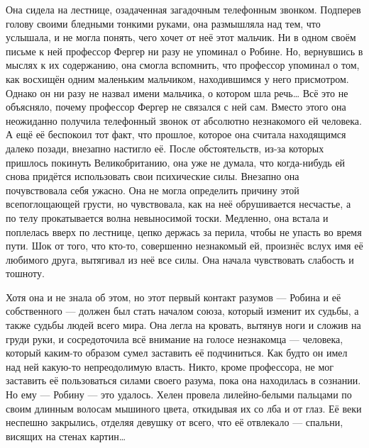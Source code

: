 \documentclass[a4paper,12pt]{book}
\begin{document}
	Она сидела на лестнице, озадаченная загадочным телефонным звонком. Подперев голову своими бледными тонкими руками, она размышляла над тем, что услышала, и не могла понять, чего хочет от неё этот мальчик. Ни в одном своём письме к ней профессор Фергер ни разу не упоминал о Робине. Но, вернувшись в мыслях к их содержанию, она смогла вспомнить, что профессор упоминал о том, как восхищён одним маленьким мальчиком, находившимся у него присмотром. Однако он ни разу не назвал имени мальчика, о котором шла речь…
	Всё это не объясняло, почему профессор Фергер не связался с ней сам. Вместо этого она неожиданно получила телефонный звонок от абсолютно незнакомого ей человека.
	А ещё её беспокоил тот факт, что прошлое, которое она считала находящимся далеко позади, внезапно настигло её.
	После обстоятельств, из-за которых пришлось покинуть Великобританию, она уже не думала, что когда-нибудь ей снова придётся использовать свои психические силы.
	Внезапно она почувствовала себя ужасно. Она не могла определить причину этой всепоглощающей грусти, но чувствовала, как на неё обрушивается несчастье, а по телу прокатывается волна невыносимой тоски.
	Медленно, она встала и поплелась вверх по лестнице, цепко держась за перила, чтобы не упасть во время пути. Шок от того, что кто-то, совершенно незнакомый ей, произнёс вслух имя её любимого друга, вытягивал из неё все силы. Она начала чувствовать слабость и тошноту.

	Хотя она и не знала об этом, но этот первый контакт разумов — Робина и её собственного — должен был стать началом союза, который изменит их судьбы, а также судьбы людей всего мира.
	Она легла на кровать, вытянув ноги и сложив на груди руки, и сосредоточила всё внимание на голосе незнакомца — человека, который каким-то образом сумел заставить её подчиниться. Как будто он имел над ней какую-то непреодолимую власть. Никто, кроме профессора, не мог заставить её пользоваться силами своего разума, пока она находилась в сознании. Но ему — Робину — это удалось.
	Хелен провела лилейно-белыми пальцами по своим длинным волосам мышиного цвета, откидывая их со лба и от глаз. Её веки неспешно закрылись, отделяя девушку от всего, что её отвлекало — спальни, висящих на стенах картин…
\end{document}
